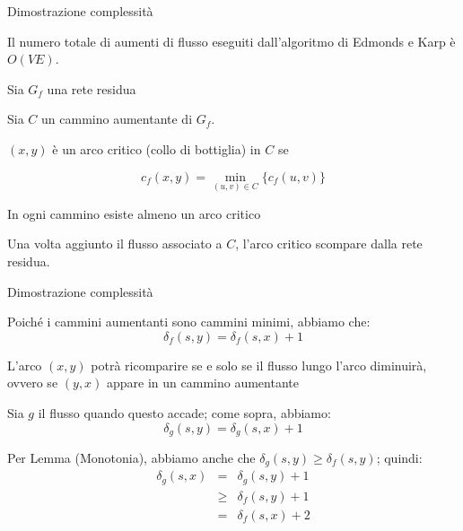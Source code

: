 \begin{frame}{Dimostrazione complessità}

\vspace{-9pt}
\begin{myboxtitle}
Il numero totale di aumenti di flusso eseguiti dall'algoritmo
di Edmonds e Karp è $O(VE)$.
\end{myboxtitle}

\BIL
\item Sia $G_f$ una rete residua
\item Sia $C$ un cammino aumentante di $G_f$. 
\item $(x,y)$ è un arco \alert{critico} (collo di bottiglia) in $C$ se 

\[
c_f(x,y) = \min_{(u,v) \in C} \{ c_f(u,v) \}
\]

\item In ogni cammino esiste almeno un arco critico
\item Una volta aggiunto il flusso associato a $C$, l'arco critico scompare dalla rete residua. 
\EIL

\end{frame}

\begin{frame}{Dimostrazione complessità}

\BIL
\item Poiché i cammini aumentanti sono cammini minimi, abbiamo che:
\[
 \delta_f(s,y) = \delta_f(s,x)+1
\]
\item L'arco $(x,y)$ potrà ricomparire se e solo se il flusso lungo l'arco 
diminuirà, ovvero se $(y,x)$ appare in un cammino aumentante
\item  Sia $g$ il flusso quando questo accade; come sopra, abbiamo:
\[
 \delta_{g}(s,y) = \delta_{g}(s,x)+1
\]
\item Per Lemma (Monotonia), abbiamo anche che $\delta_g(s,y)
\geq \delta_{f}(s,y)$; quindi:
\begin{eqnarray*}
\delta_{g}(s,x) &=& \delta_{g}(s,y)+1 \\
  & \geq & \delta_f(s,y) + 1 \\
  & = & \delta_f(s,x) + 2
\end{eqnarray*}
\EIL

\end{frame}

